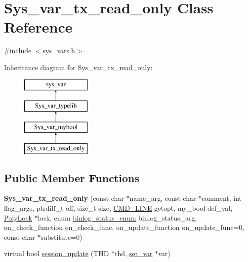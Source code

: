 \hypertarget{classSys__var__tx__read__only}{}\section{Sys\+\_\+var\+\_\+tx\+\_\+read\+\_\+only Class Reference}
\label{classSys__var__tx__read__only}


{\ttfamily \#include $<$sys\+\_\+vars.\+h$>$}

Inheritance diagram for Sys\+\_\+var\+\_\+tx\+\_\+read\+\_\+only\+:\begin{figure}[H]
\begin{center}
\leavevmode
\includegraphics[height=4.000000cm]{classSys__var__tx__read__only}
\end{center}
\end{figure}
\subsection*{Public Member Functions}
\begin{DoxyCompactItemize}
\item 
\mbox{\label{classSys__var__tx__read__only_ac07d788fae03b0daec9457bb6e2c2b95}} 
{\bfseries Sys\+\_\+var\+\_\+tx\+\_\+read\+\_\+only} (const char $\ast$name\+\_\+arg, const char $\ast$comment, int flag\+\_\+args, ptrdiff\+\_\+t off, size\+\_\+t size, \mbox{\hyperlink{structCMD__LINE}{C\+M\+D\+\_\+\+L\+I\+NE}} getopt, my\+\_\+bool def\+\_\+val, \mbox{\hyperlink{classPolyLock}{Poly\+Lock}} $\ast$lock, enum \mbox{\hyperlink{classsys__var_a664520ec82191888717c86085bfa83ce}{binlog\+\_\+status\+\_\+enum}} binlog\+\_\+status\+\_\+arg, on\+\_\+check\+\_\+function on\+\_\+check\+\_\+func, on\+\_\+update\+\_\+function on\+\_\+update\+\_\+func=0, const char $\ast$substitute=0)
\item 
virtual bool \mbox{\hyperlink{classSys__var__tx__read__only_a449265a5bbe337c98f35529132f9482b}{session\+\_\+update}} (T\+HD $\ast$thd, \mbox{\hyperlink{classset__var}{set\+\_\+var}} $\ast$var)
\end{DoxyCompactItemize}
